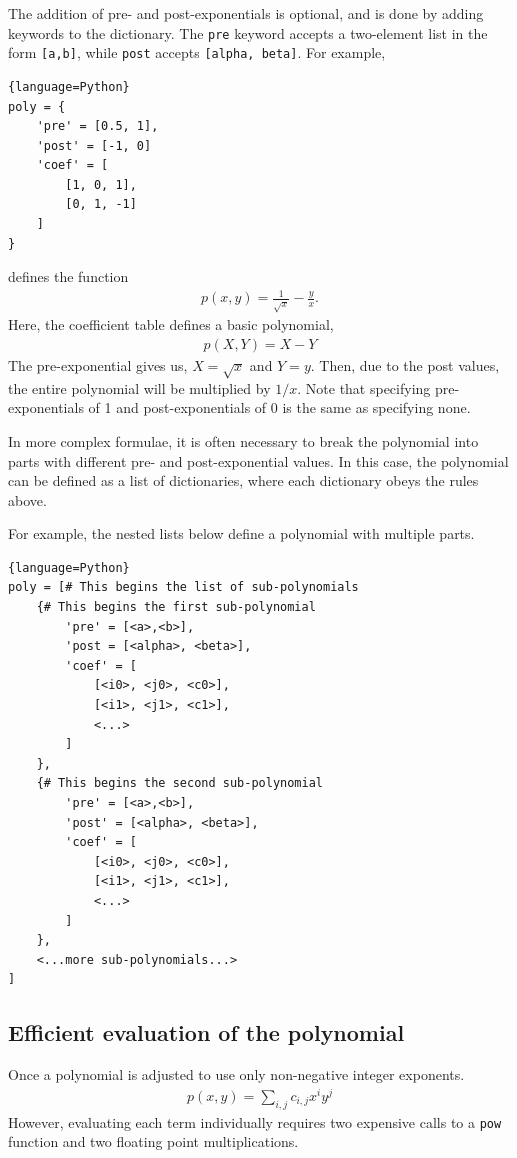 The addition of pre- and post-exponentials is optional, and is done by adding keywords to the dictionary.  The \verb|pre| keyword accepts a two-element list in the form \verb|[a,b]|, while \verb|post| accepts \verb|[alpha, beta]|.  For example,
\begin{lstlisting}{language=Python}
poly = {
    'pre' = [0.5, 1],
    'post' = [-1, 0]
    'coef' = [
        [1, 0, 1],
        [0, 1, -1]
    ]
}
\end{lstlisting}
defines the function
\begin{align}
p(x,y) = \frac{1}{\sqrt{x}} - \frac{y}{x}.
\end{align}
Here, the coefficient table defines a basic polynomial,
\begin{align}
p(X,Y) = X - Y
\end{align}
The pre-exponential gives us, $X = \sqrt{x}$ and $Y = y$.  Then, due to the post values, the entire polynomial will be multiplied by $1/x$.  Note that specifying pre-exponentials of 1 and post-exponentials of 0 is the same as specifying none.

In more complex formulae, it is often necessary to break the polynomial into parts with different pre- and post-exponential values.  In this case, the polynomial can be defined as a list of dictionaries, where each dictionary obeys the rules above.

For example, the nested lists below define a polynomial with multiple parts.
\begin{lstlisting}{language=Python}
poly = [# This begins the list of sub-polynomials
    {# This begins the first sub-polynomial
        'pre' = [<a>,<b>], 
        'post = [<alpha>, <beta>],
        'coef' = [
            [<i0>, <j0>, <c0>],
            [<i1>, <j1>, <c1>],
            <...>
        ]
    },
    {# This begins the second sub-polynomial
        'pre' = [<a>,<b>], 
        'post' = [<alpha>, <beta>],
        'coef' = [
            [<i0>, <j0>, <c0>],
            [<i1>, <j1>, <c1>],
            <...>
        ]
    },
    <...more sub-polynomials...>
]
\end{lstlisting}

\subsection{Efficient evaluation of the polynomial}

Once a polynomial is adjusted to use only non-negative integer exponents.
\begin{align}
p(x,y) = \sum_{i,j} c_{i,j} x^i y^j
\end{align}
However, evaluating each term individually requires two expensive calls to a \verb|pow| function and two floating point multiplications.

